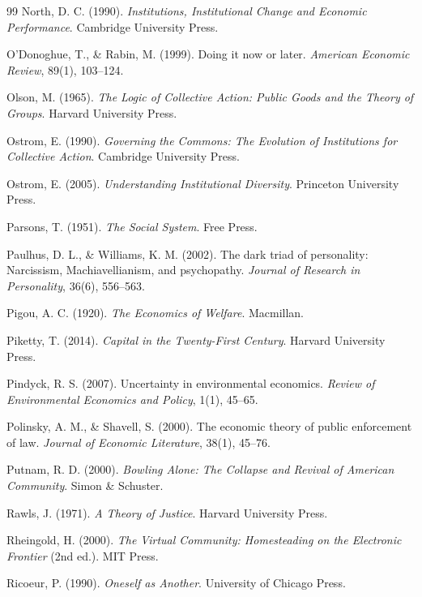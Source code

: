\begin{thebibliography}{99}
North, D. C. (1990).
\textit{Institutions, Institutional Change and Economic Performance}.
Cambridge University Press.

O'Donoghue, T., \& Rabin, M. (1999).
Doing it now or later.
\textit{American Economic Review}, 89(1), 103--124.

Olson, M. (1965).
\textit{The Logic of Collective Action: Public Goods and the Theory of Groups}.
Harvard University Press.

Ostrom, E. (1990).
\textit{Governing the Commons: The Evolution of Institutions for Collective Action}.
Cambridge University Press.

Ostrom, E. (2005).
\textit{Understanding Institutional Diversity}.
Princeton University Press.

Parsons, T. (1951).
\textit{The Social System}.
Free Press.

Paulhus, D. L., \& Williams, K. M. (2002).
The dark triad of personality: Narcissism, Machiavellianism, and psychopathy.
\textit{Journal of Research in Personality}, 36(6), 556--563.

Pigou, A. C. (1920).
\textit{The Economics of Welfare}.
Macmillan.

Piketty, T. (2014).
\textit{Capital in the Twenty-First Century}.
Harvard University Press.

Pindyck, R. S. (2007).
Uncertainty in environmental economics.
\textit{Review of Environmental Economics and Policy}, 1(1), 45--65.

Polinsky, A. M., \& Shavell, S. (2000).
The economic theory of public enforcement of law.
\textit{Journal of Economic Literature}, 38(1), 45--76.

Putnam, R. D. (2000).
\textit{Bowling Alone: The Collapse and Revival of American Community}.
Simon \& Schuster.

Rawls, J. (1971).
\textit{A Theory of Justice}.
Harvard University Press.

Rheingold, H. (2000).
\textit{The Virtual Community: Homesteading on the Electronic Frontier} (2nd ed.).
MIT Press.

Ricoeur, P. (1990).
\textit{Oneself as Another}.
University of Chicago Press.


\end{thebibliography}
